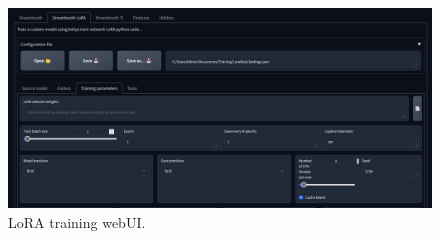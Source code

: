\documentclass[preprint]{elsarticle}
\begin{document}
\begin{figure}[H]
	\centering
	\includegraphics[width=15cm, keepaspectratio]{img/project_img/lora.png} 
	\caption{LoRA training webUI.}
	\label{fig:lora-webui}
\end{figure}
\end{document}
